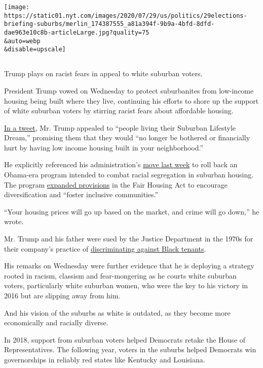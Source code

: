\texttt{[image: https://static01.nyt.com/images/2020/07/29/us/politics/29elections-briefing-suburbs/merlin\_174387555\_a81a394f-9b9a-4bfd-8dfd-dae963e10c8b-articleLarge.jpg?quality=75\\\&auto=webp\\\&disable=upscale]}

\subsection{}

Trump plays on racist fears in appeal to white suburban voters.

President Trump vowed on Wednesday to protect suburbanites from
low-income housing being built where they live, continuing his efforts
to shore up the support of white suburban voters by stirring racist
fears about affordable housing.

\href{https://twitter.com/realDonaldTrump/status/1288509568578777088?s=20}{In
a tweet}, Mr. Trump appealed to ``people living their Suburban Lifestyle
Dream,'' promising them that they would ``no longer be bothered or
financially hurt by having low income housing built in your
neighborhood.''

He explicitly referenced his administration's
\href{https://www.nytimes.com/2020/07/23/us/politics/trump-housing-discrimination-suburbs.html?searchResultPosition=1}{move
last week} to roll back an Obama-era program intended to combat racial
segregation in suburban housing. The program
\href{https://www.hud.gov/press/press_releases_media_advisories/HUD_No_20_109}{expanded
provisions} in the Fair Housing Act to encourage diversification and
``foster inclusive communities.''

``Your housing prices will go up based on the market, and crime will go
down,'' he wrote.

Mr. Trump and his father were sued by the Justice Department in the
1970s for their company's practice of
\href{https://www.nytimes.com/2016/08/28/us/politics/donald-trump-housing-race.html}{discriminating
against Black tenants}.

His remarks on Wednesday were further evidence that he is deploying a
strategy rooted in racism, classism and fear-mongering as he courts
white suburban voters, particularly white suburban women, who were the
key to his victory in 2016 but are slipping away from him.

And his vision of the suburbs as white is outdated, as they become more
economically and racially diverse.

In 2018, support from suburban voters helped Democrats retake the House
of Representatives. The following year, voters in the suburbs helped
Democrats win governorships in reliably red states like Kentucky and
Louisiana.

